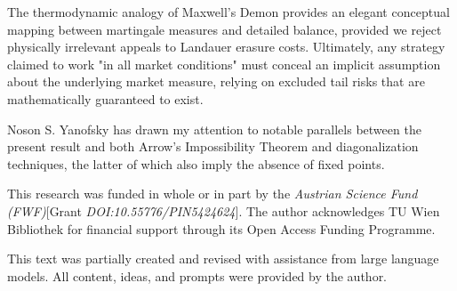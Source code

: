 \documentclass[aps,pra,reprint,superscriptaddress,amsmath,amssymb]{revtex4-2}
\theoremstyle{plain}
\theoremstyle{definition}
\theoremstyle{remark}
\begin{document}
The thermodynamic analogy of Maxwell's Demon provides an elegant conceptual mapping between martingale measures and detailed balance, provided we reject physically irrelevant appeals to Landauer erasure costs. Ultimately, any strategy claimed to work "in all market conditions" must conceal an implicit assumption about the underlying market measure, relying on excluded tail risks that are mathematically guaranteed to exist.

\begin{acknowledgments}
Noson S. Yanofsky has drawn my attention to notable parallels between the present result and both Arrow's Impossibility Theorem and diagonalization techniques, the latter of which also imply the absence of fixed points.

This research was funded in whole or in part by the \textit{Austrian Science Fund (FWF)}[Grant \textit{DOI:10.55776/PIN5424624}].
The author acknowledges TU Wien Bibliothek for financial support through its Open Access Funding Programme.

This text was partially created and revised with assistance from large language models. All content, ideas, and prompts were provided by the author.
\end{acknowledgments}


\end{document}
